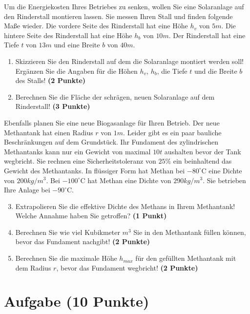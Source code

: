 \documentclass[a4paper, 9pt]{scrartcl}\usepackage[]{graphicx}\usepackage[]{xcolor}
\begin{document}
Um die Energiekosten Ihres Betriebes zu senken, wollen Sie eine Solaranlage
auf den Rinderstall montieren lassen. Sie messen Ihren Stall und finden
folgende Ma{\ss}e wieder. Die vordere Seite des Rinderstall hat eine H{\"o}he
$h_v$ von $5m$. Die hintere Seite des Rinderstall hat eine
H{\"o}he $h_b$ von $10m$. Der Rinderstall hat eine Tiefe $t$ von
$13m$ und eine Breite $b$ von $40m$.

\begin{enumerate}
\item Skizzieren Sie den Rinderstall auf dem die Solaranlage montiert
  werden soll! Erg{\"a}nzen Sie die Angaben f{\"u}r die H{\"o}hen $h_v$, $h_b$, die
  Tiefe $t$ und die Breite $b$ des Stalls!  \textbf{(2 Punkte)}
\item Berechnen Sie die Fl{\"a}che der schr{\"a}gen, neuen Solaranlage auf dem
  Rinderstall! \textbf{(3 Punkte)}
\end{enumerate}

Ebenfalls planen Sie eine neue Biogasanlage f{\"u}r Ihren Betrieb. Der neue
Methantank hat einen Radius $r$ von $1m$. Leider gibt es ein
paar bauliche Beschr{\"a}nkungen auf dem Grundst{\"u}ck. Ihr Fundament des
zylindrischen Methantanks kann nur ein Gewicht von maximal
$10t$ aushalten bevor der Tank wegbricht. Sie rechnen eine
Sicherheitstoleranz von $25\%$ ein beinhaltend das Gewicht des
Methantanks. In fl{\"u}ssiger Form hat
Methan bei $-80^\circ\text{C}$ eine Dichte von
$200kg/m^3$. Bei $-100^\circ\text{C}$ hat Methan eine Dichte
von $290kg/m^3$. Sie betrieben Ihre Anlage bei
$-90^\circ\text{C}$.

\begin{enumerate}
  \setcounter{enumi}{2}
\item Extrapolieren Sie die effektive Dichte des Methans in Ihrem
  Methantank! Welche Annahme haben Sie getroffen? \textbf{(1 Punkt)}
\item Berechnen Sie wie viel Kubikmeter $m^3$ Sie in den Methantank f{\"u}llen
  k{\"o}nnen, bevor das Fundament nachgibt! \textbf{(2 Punkte)}
\item Berechnen Sie die maximale H{\"o}he $h_{max}$ f{\"u}r den gef{\"u}llten
  Methantank mit dem Radius $r$, bevor das Fundament wegbricht! \textbf{(2
    Punkte)}
\end{enumerate}

 
\clearpage

\section{Aufgabe \hfill (10 Punkte)}
\end{document}

